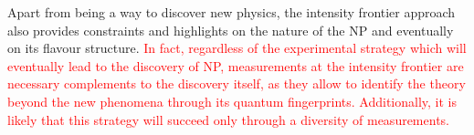 Apart from being a way to discover new physics, the intensity frontier approach  also provides constraints and highlights on the nature of the NP and eventually on its flavour structure. 
\textcolor{red}{In fact, regardless of the experimental strategy which will eventually lead to the discovery of NP, measurements at the intensity frontier are necessary complements to the discovery itself, as they allow to  identify the theory beyond the new phenomena  through its quantum fingerprints. Additionally, it is likely that this strategy will succeed only through a diversity of measurements.}  



